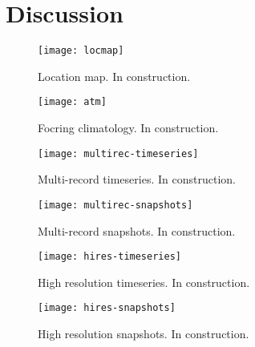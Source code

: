\documentclass[tc, ms]{copernicus}
\begin{document}
\section{Discussion}
\label{sec:discussion}


\conclusions
\label{sec:concl}


%


\begin{figure}
  \texttt{[image: locmap]}
  \caption{Location map. In construction.}
  \label{fig:locmap}
\end{figure}

\begin{figure}
  \texttt{[image: atm]}
  \caption{Focring climatology. In construction.}
  \label{fig:atm}
\end{figure}

\begin{figure}
  \texttt{[image: multirec-timeseries]}
  \caption{Multi-record timeseries. In construction.}
  \label{fig:multirec-timeseries}
\end{figure}

\begin{figure}
  \texttt{[image: multirec-snapshots]}
  \caption{Multi-record snapshots. In construction.}
  \label{fig:multirec-snapshots}
\end{figure}

\begin{figure}
  \texttt{[image: hires-timeseries]}
  \caption{High resolution timeseries. In construction.}
  \label{fig:hires-timeseries}
\end{figure}

\begin{figure}
  \texttt{[image: hires-snapshots]}
  \caption{High resolution snapshots. In construction.}
  \label{fig:hires-snapshots}
\end{figure}
\end{document}
